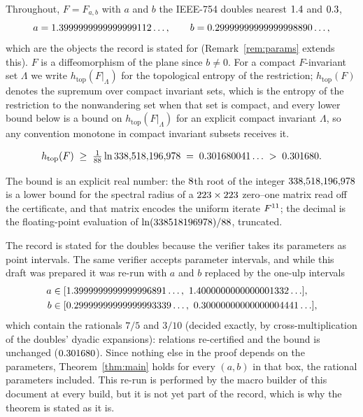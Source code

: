 \documentclass[11pt]{article}
\newcommand{\htop}{h_{\mathrm{top}}}
\begin{document}
Throughout, $F=F_{a,b}$ with $a$ and $b$ the IEEE-754 doubles nearest $1.4$ and $0.3$,
\[
a=1.3999999999999999112\ldots,\qquad b=0.29999999999999998890\ldots,
\]
which are the objects the record is stated for (Remark~\ref{rem:params} extends this). $F$ is a diffeomorphism of
the plane since $b\ne0$. For a compact $F$-invariant set $\Lambda$ we write $\htop(F|_\Lambda)$ for the topological
entropy of the restriction; $\htop(F)$ denotes the supremum over compact invariant sets, which is the entropy of
the restriction to the nonwandering set when that set is compact, and every lower bound below is a bound on
$\htop(F|_\Lambda)$ for an explicit compact invariant $\Lambda$, so any convention monotone in compact invariant
subsets receives it.

\begin{theorem}\label{thm:main}
\[
\htop(F)\;\ge\;\ExactBound\;=\;\HLBNine\ldots\;>\;\HLB .
\]
\end{theorem}

The bound is an explicit real number: the $8$th root of the integer $338{,}518{,}196{,}978$ is a lower bound for the
spectral radius of a $223\times223$ zero--one matrix read off the certificate, and that matrix encodes
the uniform iterate $F^{11}$; the decimal is the floating-point evaluation of $\ln(338518196978)/88$,
truncated.

\begin{remark}\label{rem:params}
The record is stated for the doubles because the verifier takes its parameters as point intervals. The same
verifier accepts parameter intervals, and while this draft was prepared it was re-run with $a$ and $b$ replaced by
the one-ulp intervals
\[
\begin{aligned}
a&\in[1.3999999999999996891\ldots,\ 1.4000000000000001332\ldots],\\
b&\in[0.29999999999999993339\ldots,\ 0.30000000000000004441\ldots],
\end{aligned}
\]
which contain the rationals $7/5$ and $3/10$ (decided exactly, by cross-multiplication of the doubles' dyadic
expansions): \IntervalRerunAll{} \IntervalRerunCertified{} relations re-certified and the bound is unchanged
($0.301680$). Since nothing else in the proof depends on the parameters, Theorem~\ref{thm:main} holds
for every $(a,b)$ in that box, the rational parameters included. This re-run is performed by the macro builder of
this document at every build, but it is not yet part of the record, which is why the theorem is stated as it is.
\end{remark}
\end{document}
